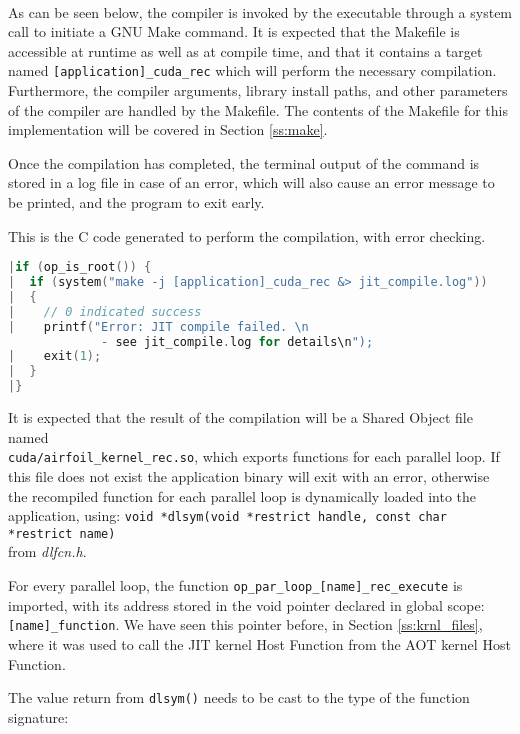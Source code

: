 \\
As can be seen below, the compiler is invoked by the executable through a system call to initiate a GNU Make \cite{make} command. It is expected that the Makefile is accessible at runtime as well as at compile time, and that it contains a target named \verb|[application]_cuda_rec| which will perform the necessary compilation. Furthermore, the compiler arguments, library install paths, and other parameters of the compiler are handled by the Makefile. The contents of the Makefile for this implementation will be covered in Section \ref{ss:make}.\par
Once the compilation has completed, the terminal output of the command is stored in a log file in case of an error, which will also cause an error message to be printed, and the program to exit early.
\par
\noindent This is the C code generated to perform the compilation, with error checking.
\vspace{1em}
\begin{lstlisting}[backgroundcolor=\color{red!20}, language=C]
|if (op_is_root()) {
|  if (system("make -j [application]_cuda_rec &> jit_compile.log"))
|  {
|    // 0 indicated success
|    printf("Error: JIT compile failed. \n
             - see jit_compile.log for details\n");
|    exit(1);
|  }
|}
\end{lstlisting}
\par
\noindent It is expected that the result of the compilation will be a Shared Object file named\\ \verb|cuda/airfoil_kernel_rec.so|, which exports functions for each parallel loop. If this file does not exist the application binary will exit with an error, otherwise the recompiled function for each parallel loop is dynamically loaded into the application, using: \verb|void *dlsym(void *restrict handle, const char *restrict name)|\\ from \textit{dlfcn.h}.
\par
\noindent For every parallel loop, the function \verb|op_par_loop_[name]_rec_execute| is imported, with its address stored in the void pointer declared in global scope: \verb|[name]_function|. We have seen this pointer before, in Section \ref{ss:krnl_files}, where it was used to call the JIT kernel Host Function from the AOT kernel Host Function.
\par
The value return from \verb|dlsym()| needs to be cast to the type of the function signature:

